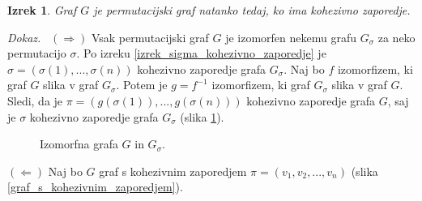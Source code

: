 \documentclass[a4paper, 12pt]{book}
\newtheorem{izrek}{Izrek}[chapter]
\newenvironment{dokaz}{\emph{Dokaz.}\ }{\hspace{\fill}{$\Box$}}
\begin{document}
\begin{izrek}
\label{izrek_permutacijski_graf_kohezivno_zaporedje}
    Graf $G$ je permutacijski graf natanko tedaj, ko ima kohezivno zaporedje.
\end{izrek}
\begin{dokaz}
    $(\Rightarrow)$ Vsak permutacijski graf $G$ je izomorfen nekemu grafu $G_{\sigma}$ za neko permutacijo $\sigma$. Po izreku \ref{izrek_sigma_kohezivno_zaporedje} je $\sigma = (\sigma(1), ..., \sigma(n))$ kohezivno zaporedje grafa $G_{\sigma}$. Naj bo $f$ izomorfizem, ki graf $G$ slika v graf $G_{\sigma}$. Potem je $g = f^{-1}$ izomorfizem, ki graf $G_{\sigma}$ slika v graf $G$. Sledi, da je $\pi = (g(\sigma(1)), ..., g(\sigma(n)))$ kohezivno zaporedje grafa $G$, saj je $\sigma$ kohezivno zaporedje grafa $G_{\sigma}$ (slika \ref{graf_izomorfizem_f_k3}).

    \begin{figure}[h]
        \begin{center}        
        \end{center}
        \caption{Izomorfna grafa $G$ in $G_{\sigma}$.}
        \label{graf_izomorfizem_f_k3}
    \end{figure}

    $(\Leftarrow)$ Naj bo $G$ graf s kohezivnim zaporedjem $\pi = (v_1, v_2, ..., v_n)$ (slika \ref{graf_s_kohezivnim_zaporedjem}). 
    \begin{figure}[h]
        \begin{center}
\end{center}
\end{figure}
\end{dokaz}
\end{document}
